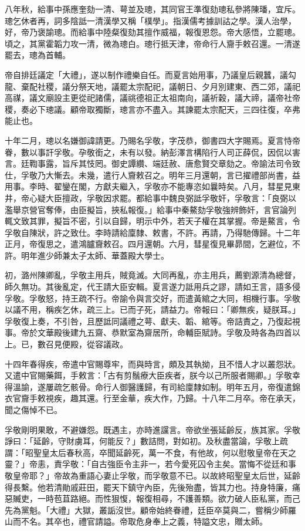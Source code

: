 \begin{pinyinscope}
八年秋，給事中孫應奎劾一清、萼並及璁，其同官王準復劾璁私參將陳璠，宜斥。璁乞休者再，詞多陰詆一清漢學又稱「樸學」。指漢儒考據訓詁之學。漢人治學，好，帝乃褒諭璁。而給事中陸粲復劾其擅作威福，報復恩怨。帝大感悟，立罷璁。頃之，其黨霍韜力攻一清，微為璁白。璁行抵天津，帝命行人齎手敕召還。一清遂罷去，璁為首輔。

帝自排廷議定「大禮」，遂以制作禮樂自任。而夏言始用事，乃議皇后親蠶，議勾龍、棄配社稷，議分祭天地，議罷太宗配祀，議朝日、夕月別建東、西二郊，議祀高禖，議文廟設主更從祀諸儒，議祧德祖正太祖南向，議祈穀，議大禘，議帝社帝稷，奏必下璁議。顧帝取獨斷，璁言亦不盡入。其諫罷太宗配天，三四往復，卒弗能止也。

十年二月，璁以名嫌御諱請更。乃賜名孚敬，字茂恭，御書四大字賜焉。夏言恃帝眷，數以事訐孚敬。孕敬銜之，未有以發。納彭澤言構陷行人司正薛侃，因侃以害言。廷鞫事露，旨斥其忮罔。御史譚纘、端廷赦、唐愈賢交章劾之。帝諭法司令致仕，孚敬乃大慚去。未幾，遣行人齎敕召之。明年三月還朝，言已擢禮部尚書，益用事。李時、翟鑾在閣，方獻夫繼入，孚敬亦不能專恣如曩時矣。八月，彗星見東井，帝心疑大臣擅政，孚敬因求罷。都給事中魏良弼詆孚敬奸，孚敬言：「良弼以濫舉京營官奪俸，由臣擬旨，挾私報復。」給事中秦鰲劾孚敬強辨飾奸，言官論列輒文致其罪，擬旨不密，引以自歸，明示中外，若天子權在其掌握。帝是鰲言，令孚敬自陳狀，許之致仕。李時請給廩隸、敕書，不許。再請，乃得馳傳歸。十二年正月，帝復思之，遣鴻臚齎敕召。四月還朝。六月，彗星復見畢昴間，乞避位，不許。明年進少師兼太子太師、華蓋殿大學士。

初，潞州陳卿亂，孚敬主用兵，賊竟滅。大同再亂，亦主用兵，薦劉源清為總督，師久無功。其後亂定，代王請大臣安輯。夏言遂力詆用兵之謬，請如王言，語多侵孚敬。孚敬怒，持王疏不行。帝諭令與言交好，而遣黃綰之大同，相機行事。孚敬以議不用，稱疾乞休，疏三上。已而子死，請益力。帝報曰：「卿無疾，疑朕耳。」孚敬復上奏，不引咎，且歷詆同議禮之萼、獻夫、韜、綰等。帝詰責之，乃復起視事。帝於文華殿後建九五齋、恭默室為齋居所，命輔臣賦詩。孚敬及時各為四首以上。已，數召見便殿，從容議政。

十四年春得疾，帝遣中官賜尊牢，而與時言，頗及其執拗，且不惜人才以叢怨狀。又遣中官賜藥餌，手敕言：「古有剪鬚療大臣疾者，朕今以己所服者賜卿。」孚敬幸得溫諭，遂屢疏乞骸骨。命行人御醫護歸，有司給廩隸如制。明年五月，帝復遣錦衣官齎手敕視疾，趣其還。行至金華，疾大作，乃歸。十八年二月卒。帝在承天，聞之傷悼不已。

孚敬剛明果敢，不避嫌怨。既遇主，亦時進讜言。帝欲坐張延齡反，族其家。孚敬諍曰：「延齡，守財虜耳，何能反？」數詰問，對如初。及秋盡當論，孚敬上疏謂：「昭聖皇太后春秋高，卒聞延齡死，萬一不食，有他故，何以慰敬皇帝在天之靈？」帝恚，責孚敬：「自古強臣令主非一，若今愛死囚令主矣。當悔不從廷和事敬皇帝耶？」帝故為重語心妻止孚敬，而孚敬意不已。以故終昭聖皇太后世，延齡得長繫。他若清勛戚莊田，罷天下鎮守內臣，先後殆盡，皆其力也。持身特廉，痛惡贓吏，一時苞苴路絕。而性狠愎，報復相尋，不護善類。欲力破人臣私黨，而己先為黨魁。「大禮」大獄，叢詬沒世。顧帝始終眷禮，廷臣卒莫與二，嘗稱少師羅山而不名。其卒也，禮官請謚。帝取危身奉上之義，特謚文忠，贈太師。


\end{pinyinscope}
